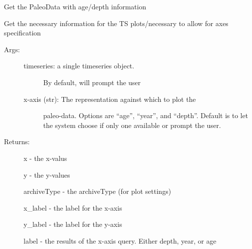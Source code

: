 \documentclass[letterpaper,10pt,english]{sphinxmanual}
\begin{document}
\begin{fulllineitems}
\label{\detokenize{SummaryPlots:pyleoclim.SummaryPlots.TsData}}
Get the PaleoData with age/depth information

Get the necessary information for the TS plots/necessary to allow for
axes specification
\begin{description}
\item[{Args:}] \leavevmode\begin{description}
\item[{timeseries: a single timeseries object. }] \leavevmode
By default, will prompt the user

\item[{x-axis (str): The representation against which to plot the }] \leavevmode
paleo-data. Options are “age”, “year”, and “depth”. 
Default is to let the system choose if only one available 
or prompt the user.

\end{description}

\item[{Returns:}] \leavevmode
x - the x-valus

y - the y-values

archiveType - the archiveType (for plot settings)

x\_label - the label for the x-axis

y\_label - the label for the y-axis

label - the results of the x-axis query. Either depth, year, or age

\end{description}

\end{fulllineitems}

\end{document}
